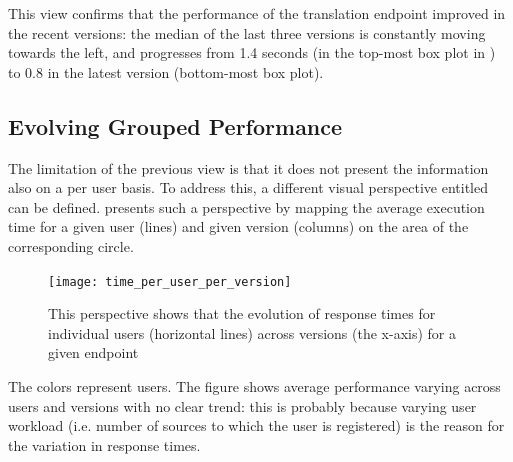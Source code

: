   This view confirms that the performance of the translation endpoint improved in the recent versions: the median of the last three versions is constantly moving towards the left, and progresses from 1.4 seconds (in the top-most box plot in ) to 0.8 in the latest version (bottom-most box plot).


\subsection*{Evolving Grouped Performance}
  The limitation of the previous view is that it does not present the information also on a per user basis. To address this, a different visual perspective entitled  can be defined.  presents such a perspective by mapping the average execution time for a given user (lines) and given version (columns) on the area of the corresponding circle. 

\begin{figure}[h!]
  \centering
  \texttt{[image: time\_per\_user\_per\_version]}
  \caption{This perspective shows that the evolution of response times for individual users (horizontal lines) across versions (the x-axis) for a given endpoint}
  \label{fig:tuv}
\end{figure}


The colors represent users. The figure shows average performance varying  across users and versions with no clear trend: this is probably because varying user workload (i.e. number of sources to which the user is registered) is the reason for the variation in response times.  


  
